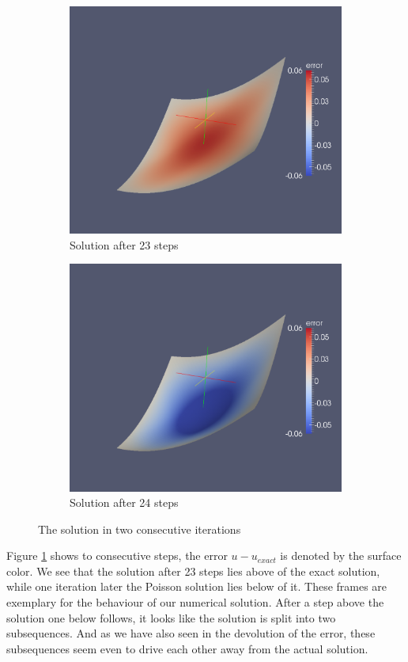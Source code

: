 \begin{figure}[h]
\begin{subfigure}[b]{.5\textwidth}
	\includegraphics[width=1.\textwidth]{plots/with_penalty_it22.pdf}
	\caption{Solution after 23 steps}
\end{subfigure}
\begin{subfigure}[b]{.5\textwidth}
	\includegraphics[width=1.\textwidth]{plots/with_penalty_it23.pdf}
	\caption{Solution after 24 steps}
\end{subfigure}
\caption{The solution in two consecutive iterations}
\label{fig: diff iteration}
\end{figure}
Figure \ref{fig: diff iteration} shows to consecutive steps, the error $u-u_{exact}$ is denoted by the surface color. We see that the solution after 23 steps lies above of the exact solution, while one iteration later the Poisson solution lies below of it. These frames are exemplary for the behaviour of our numerical solution. After a step above the solution one below follows, it looks like the solution is split into two subsequences.  And as we have also seen in the devolution of the error, these subsequences seem even to drive each other away from the actual solution.

